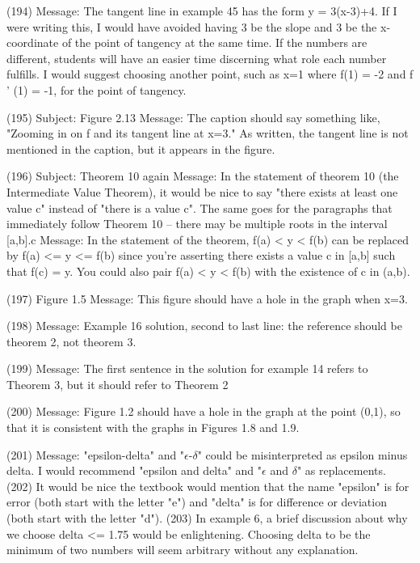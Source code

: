 {(194)  Message: The tangent line in example 45 has the form y = 3(x-3)+4. If I were writing this, I would have avoided having 3 be the slope and 3 be the x-coordinate of the point of tangency at the same time. If the numbers are different, students will have an easier time discerning what role each number fulfills. I would suggest choosing another point, such as x=1 where f(1) = -2 and f ' (1) = -1, for the point of tangency.

(195)  Subject: Figure 2.13   Message: The caption should say something like, "Zooming in on f and its tangent line at x=3." As written, the tangent line is not mentioned in the caption, but it appears in the figure.

(196)  Subject: Theorem 10 again  Message: In the statement of theorem 10 (the Intermediate Value Theorem), it would be nice to say "there exists at least one value c" instead of "there is a value c". The same goes for the paragraphs that immediately follow Theorem 10 -- there may be multiple roots in the interval [a,b].c    Message: In the statement of the theorem, f(a) < y < f(b) can be replaced by f(a) <= y <= f(b) since you're asserting there exists a value c in [a,b] such that f(c) = y. You could also pair f(a) < y < f(b) with the existence of c in (a,b).

(197)  Figure 1.5   Message: This figure should have a hole in the graph when x=3.

(198)  Message: Example 16 solution, second to last line: the reference should be theorem 2, not theorem 3.

(199)  Message: The first sentence in the solution for example 14 refers to Theorem 3, but it should refer to Theorem 2

(200)  Message: Figure 1.2 should have a hole in the graph at the point (0,1), so that it is consistent with the graphs in Figures 1.8 and 1.9.

(201)  Message: "epsilon-delta" and "$\epsilon$-$\delta$" could be misinterpreted as epsilon minus delta. I would recommend "epsilon and delta" and "$\epsilon$ and $\delta$" as replacements.       
(202)  It would be nice the textbook would mention that the name "epsilon" is for error (both start with the letter "e") and "delta" is for difference or deviation (both start with the letter "d").       
(203)  In example 6, a brief discussion about why we choose delta <= 1.75 would be enlightening. Choosing delta to be the minimum of two numbers will seem arbitrary without any explanation.

}
